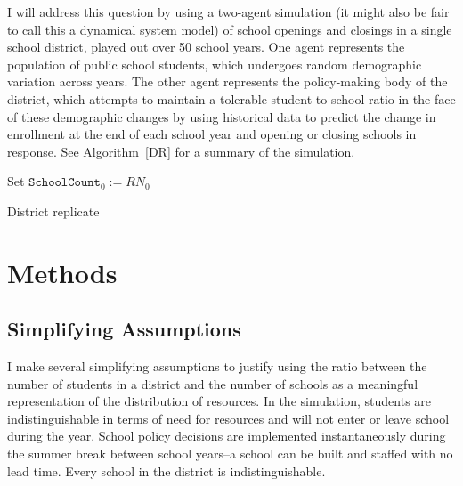 \documentclass{article}
\begin{document}
I will address this question by using a two-agent simulation (it might also be fair to call this a dynamical system model) of school openings and closings in a single school district, played out over 50 school years. One agent represents the population of public school students, which undergoes random demographic variation across years. The other agent represents the policy-making body of the district, which attempts to maintain a tolerable student-to-school ratio in the face of these demographic changes by using historical data to predict the change in enrollment at the end of each school year and opening or closing schools in response.
See Algorithm~\ref{DR} for a summary of the simulation.
\begin{algorithm}
\SetAlgoLined
{}
Set $\texttt{SchoolCount}_0  := RN_0$ \\
\caption{District replicate\label{DR}}
\end{algorithm}

\section*{Methods}
\subsection*{Simplifying Assumptions}
I make several simplifying assumptions to justify using the ratio between the number of students in a district and the number of schools as a meaningful representation of the distribution of resources.
In the simulation, students are indistinguishable in terms of need for resources and will not enter or leave school during the year.
School policy decisions are implemented instantaneously during the summer break between school years--a school can be built and staffed with no lead time. Every school in the district is indistinguishable. 
\end{document}
